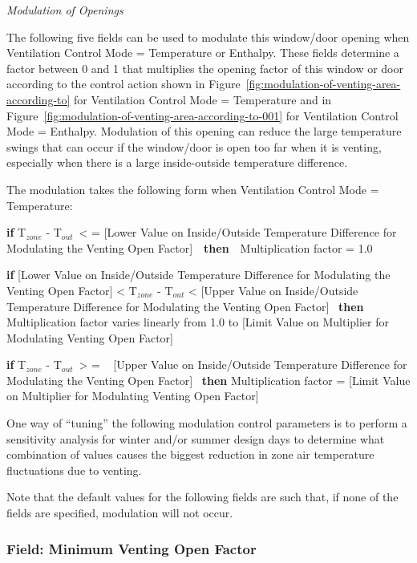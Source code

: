 \emph{Modulation of Openings}

The following five fields can be used to modulate this window/door opening when Ventilation Control Mode = Temperature or Enthalpy. These fields determine a factor between 0 and 1 that multiplies the opening factor of this window or door according to the control action shown in Figure~\ref{fig:modulation-of-venting-area-according-to} for Ventilation Control Mode = Temperature and in Figure~\ref{fig:modulation-of-venting-area-according-to-001} for Ventilation Control Mode = Enthalpy. Modulation of this opening can reduce the large temperature swings that can occur if the window/door is open too far when it is venting, especially when there is a large inside-outside temperature difference.

The modulation takes the following form when Ventilation Control Mode = Temperature:

\textbf{if} T\(_{zone}\) - T\(_{out}\)~\textless{} = {[}Lower Value on Inside/Outside Temperature Difference for Modulating the Venting Open Factor{]}~~\textbf{then}~~Multiplication factor = 1.0

\textbf{if} {[}Lower Value on Inside/Outside Temperature Difference for Modulating the Venting Open Factor{]} \textless{} T\(_{zone}\) - T\(_{out}\) \textless{} {[}Upper Value on Inside/Outside Temperature Difference for Modulating the Venting Open Factor{]}~ \textbf{then} Multiplication factor varies linearly from 1.0 to {[}Limit Value on Multiplier for Modulating Venting Open Factor{]}

\textbf{if} T\(_{zone}\) - T\(_{out}\)~\textgreater{} = ~ {[}Upper Value on Inside/Outside Temperature Difference for Modulating the Venting Open Factor{]}~ \textbf{then} Multiplication factor = {[}Limit Value on Multiplier for Modulating Venting Open Factor{]}

One way of ``tuning'' the following modulation control parameters is to perform a sensitivity analysis for winter and/or summer design days to determine what combination of values causes the biggest reduction in zone air temperature fluctuations due to venting.

Note that the default values for the following fields are such that, if none of the fields are specified, modulation will not occur.

\subsubsection{Field: Minimum Venting Open Factor}\label{field-minimum-venting-open-factor-1}

